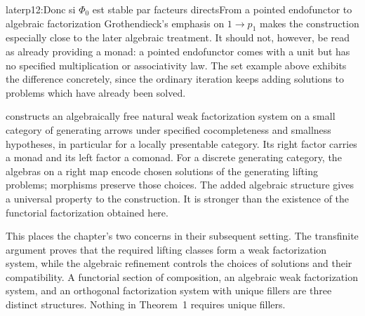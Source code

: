 \begin{dcomment}{later}{p12:Donc si $\Phi_0$ est stable par facteurs directs}{From a pointed endofunctor to algebraic factorization}
Grothendieck's emphasis on $1\to p_1$ makes the construction especially close to the later algebraic treatment. It should not, however, be read as already providing a monad: a pointed endofunctor comes with a unit but has no specified multiplication or associativity law. The set example above exhibits the difference concretely, since the ordinary iteration keeps adding solutions to problems which have already been solved.

\citet[Theorem~4.4]{Garner2009} constructs an algebraically free natural weak factorization system on a small category of generating arrows under specified cocompleteness and smallness hypotheses, in particular for a locally presentable category. Its right factor carries a monad and its left factor a comonad. For a discrete generating category, the algebras on a right map encode chosen solutions of the generating lifting problems; morphisms preserve those choices. The added algebraic structure gives a universal property to the construction. It is stronger than the existence of the functorial factorization obtained here.

This places the chapter's two concerns in their subsequent setting. The transfinite argument proves that the required lifting classes form a weak factorization system, while the algebraic refinement controls the choices of solutions and their compatibility. A functorial section of composition, an algebraic weak factorization system, and an orthogonal factorization system with unique fillers are three distinct structures. Nothing in Theorem~1 requires unique fillers.
\end{dcomment}

